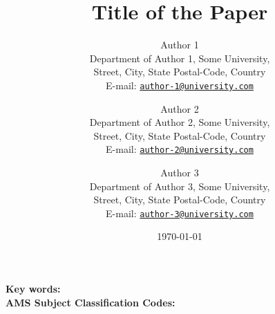 

	\title{Title of the Paper}
	\author{
		Author 1\\
		\small{Department of Author 1, Some University,}\\\small{Street, City, State Postal-Code, Country}\\
		\small E-mail: \href{mailto:author-1@university.com}{\texttt{author-1@university.com}}
		\and
		Author 2\\
		\small{Department of Author 2, Some University,}\\\small{Street, City, State Postal-Code, Country}\\
		\small E-mail: \href{mailto:author-2@university.com}{\texttt{author-2@university.com}}
		\and
		Author 3\\
		\small{Department of Author 3, Some University,}\\\small{Street, City, State Postal-Code, Country}\\
		\small E-mail: \href{mailto:author-3@university.com}{\texttt{author-3@university.com}}
	}
	\newpage
	\begin{titlingpage}
		\maketitle
		\indent\indent\small\textbf{Key words:} \small\\
		\indent\indent\small\textbf{AMS Subject Classification Codes:} \small\\
		\date{\today}
		\begin{abstract}
			
		\end{abstract}
	\end{titlingpage}
	\newpage
	
\newpage


